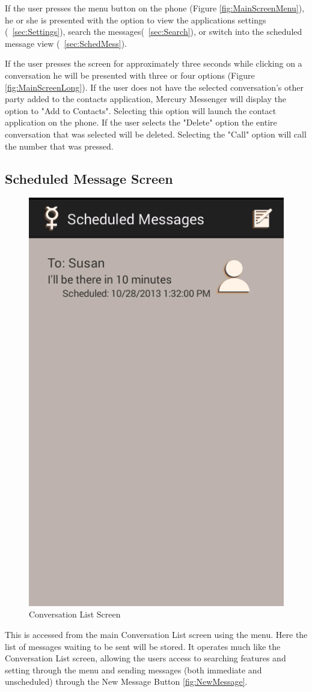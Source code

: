 \documentclass{article}
\begin{document}
\par If the user presses the menu button on the phone (Figure \ref{fig:MainScreenMenu}), he or she is presented with the option to view the applications settings (~\autoref{sec:Settings}), search the messages(~\autoref{sec:Search}), or switch into the scheduled message view (~\autoref{sec:SchedMess}).
\par If the user presses the screen for approximately three seconds while clicking on a conversation he will be presented with three or four options (Figure \ref{fig:MainScreenLong}).
If the user does not have the selected conversation's other party added to the contacts application, Mercury Messenger will display the option to "Add to Contacts". Selecting this option will launch the contact application on the phone.
If the user selects the "Delete" option the entire conversation that was selected will be deleted. Selecting the "Call" option will call the number that was pressed. 



\subsection{Scheduled Message Screen}
\label{sec:SchedMess}

\begin{figure}[h!]
\centering
\includegraphics[width=.25\textwidth]{"./Screen_shots/Scheduled_MessagE_Screen"}{}
\caption{Conversation List Screen}

\end{figure}

This is accessed from the main Conversation List screen using the menu. Here the list of messages waiting to be sent will be stored. It operates much like the Conversation List screen, allowing the users access to searching features and setting through the menu and sending messages (both immediate and unscheduled) through the New Message Button \ref{fig:NewMessage}. 
\end{document}
